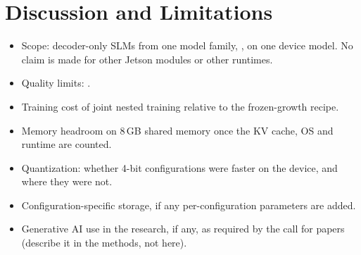\section{Discussion and Limitations}
\label{sec:discussion}


\begin{itemize}
  \item Scope: decoder-only SLMs from one model family, , on one device model. No claim is made for other Jetson modules or other runtimes.
  \item Quality limits: .
  \item Training cost of joint nested training relative to the frozen-growth recipe.
  \item Memory headroom on 8\,GB shared memory once the KV cache, OS and runtime are counted.
  \item Quantization: whether 4-bit configurations were faster on the device, and where they were not.
  \item Configuration-specific storage, if any per-configuration parameters are added.
  \item Generative AI use in the research, if any, as required by the call for papers (describe it in the methods, not here).
\end{itemize}
